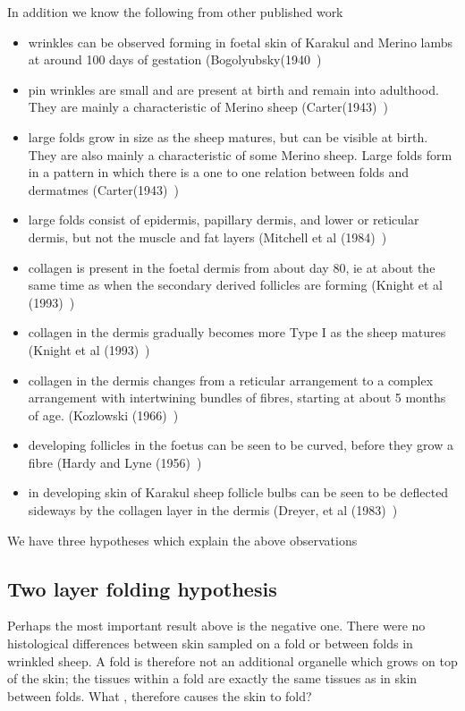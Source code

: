 \documentclass[titlepage]{article}  %
\begin{document}
In addition we know the following from other published work
\begin{itemize}
\item wrinkles can be observed forming in foetal skin of Karakul and Merino lambs at around 100 days of gestation (Bogolyubsky(1940~\cite{bogo:40})
\item pin wrinkles are small and are present at birth and remain into adulthood. They are mainly a characteristic of Merino sheep (Carter(1943)~\cite{cart:43})
\item large folds grow in size as the sheep matures, but can be visible at birth. They are also mainly a characteristic of some Merino sheep. Large folds form in a pattern in which there is a one to one relation between folds and dermatmes (Carter(1943)~\cite{cart:43})
\item large folds consist of epidermis, papillary dermis, and lower or reticular dermis, but not the muscle and fat layers (Mitchell et al (1984)~\cite{mitc:84})
\item collagen is present in the foetal dermis from about day 80, ie at about the same time as when the secondary derived follicles are forming (Knight et al (1993)~\cite{knig:93})
\item collagen in the dermis gradually becomes more Type I as the sheep matures (Knight et al (1993)~\cite{knig:93})
\item collagen in the dermis changes from a reticular arrangement to a complex arrangement with intertwining bundles of fibres, starting at about 5 months of age. (Kozlowski (1966)~\cite{kozl:66})
\item developing follicles in the foetus can be seen to be curved, before they grow a fibre (Hardy and Lyne (1956)~\cite{hard:56})
\item in developing skin of Karakul sheep follicle bulbs can be seen to be deflected sideways by the collagen layer in the dermis (Dreyer, et al (1983)~\cite{drey:83})
\end{itemize}

We have three hypotheses which explain the above observations
\subsection{Two layer folding hypothesis}
Perhaps the most important result above is the negative one. There were no histological differences between skin sampled on a fold or between folds in wrinkled sheep. A fold is therefore not an additional organelle which grows on top of the skin; the tissues within a fold are exactly the same tissues as in skin between folds. What , therefore causes the skin to fold?
\end{document}
